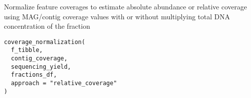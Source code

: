 \documentclass[a4paper]{book}
\begin{document}
%
\begin{Description}\relax
Normalize feature coverages to estimate absolute abundance or relative coverage using MAG/contig coverage values with or without multiplying total DNA concentration of the fraction
\end{Description}
%
\begin{Usage}
\begin{verbatim}
coverage_normalization(
  f_tibble,
  contig_coverage,
  sequencing_yield,
  fractions_df,
  approach = "relative_coverage"
)
\end{verbatim}
\end{Usage}
%
\end{document}
